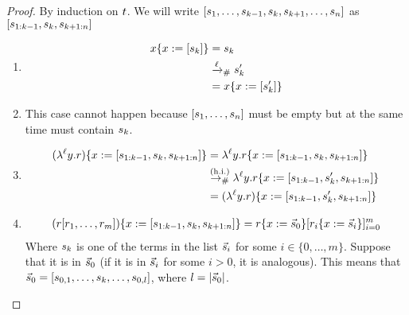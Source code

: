 \begin{proof}
By induction on $t$. 
We will write $[s_1, \hdots, s_{k-1}, s_k, s_{k+1}, \hdots, s_n]$ as
$[s_{1:k-1}, s_k, s_{k+1:n}]$
\begin{enumerate}
\item {}
  \begin{equation*}\begin{split}
    x\{x := [s_k]\}
       & = s_k \\
       & \mathrel{\xrightarrow{\ell}_{\mathtt{\#}}} s'_k \\
       & = x\{x := [s'_k]\} \\
  \end{split}\end{equation*}
\item {}
  This case cannot happen because $[s_1, \hdots, s_n]$ must
  be empty but at the same time must contain $s_k$.
\item {}
  \begin{equation*}\begin{split}
    (\lambda^{\ell} y. r)\{x := [s_{1:k-1}, s_k, s_{k+1:n}]\}
       & = \lambda^{\ell} y. r\{x := [s_{1:k-1}, s_k, s_{k+1:n}]\} \\
       & \overset{\mathrm{(h.i.)}}{\mathrel{\to_{\mathtt{\#}}}} \lambda^{\ell} y. r\{x := [s_{1:k-1}, s'_k, s_{k+1:n}]\} \\
       & = (\lambda^{\ell} y. r)\{x := [s_{1:k-1}, s'_k, s_{k+1:n}]\} \\
  \end{split}\end{equation*}
\item {}
  \begin{equation*}\begin{split}
    (r [r_1, \hdots, r_m])\{x := [s_{1:k-1}, s_k, s_{k+1:n}]\}
       & = r\{x := \vec{s}_0\} [r_i\{x := \vec{s}_i\}]_{i=0}^m \\
  \end{split}\end{equation*}
  Where $s_k$ is one of the terms in the list $\vec{s}_i$ for some $i \in \{0, \hdots, m\}$.
  Suppose that it is in $\vec{s}_0$ (if it is in $\vec{s}_i$ for some $i > 0$, it is analogous).
  This means that
  $\vec{s}_0 = [s_{0,1}, \hdots, s_k, \hdots, s_{0, l}]$,
  where $l = |\vec{s}_0|$.


\end{enumerate}
\end{proof}
